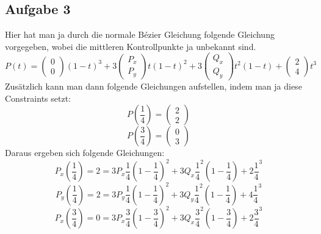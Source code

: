 \subsection{Aufgabe 3}
Hier hat man ja durch die normale Bézier Gleichung folgende Gleichung vorgegeben, wobei die mittleren Kontrollpunkte ja unbekannt sind.
\begin{displaymath}
P(t) =  \begin{pmatrix}0 \\ 0\end{pmatrix} (1-t)^3 + 3 \begin{pmatrix}P_x \\ P_y\end{pmatrix}t(1-t)^2+3 \begin{pmatrix}Q_x \\ Q_y\end{pmatrix}t^2(1-t)+ \begin{pmatrix}2 \\ 4\end{pmatrix}t^3
\end{displaymath}
Zusätzlich kann man dann folgende Gleichungen aufstellen, indem man ja diese Constraints setzt:
\begin{displaymath}
P\left(\frac{1}{4}\right) =  \begin{pmatrix}2 \\ 2\end{pmatrix}
\end{displaymath}
\begin{displaymath}
P\left(\frac{3}{4}\right) =  \begin{pmatrix}0 \\ 3\end{pmatrix}
\end{displaymath}
Daraus ergeben sich folgende Gleichungen:
\begin{displaymath}
P_x\left(\frac{1}{4}\right) = 2 = 3 P_x \frac{1}{4}\left(1-\frac{1}{4}\right)^2+3Q_x\frac{1}{4}^2\left(1-\frac{1}{4}\right)+2\frac{1}{4}^3
\end{displaymath}
\begin{displaymath}
P_y\left(\frac{1}{4}\right) = 2 = 3 P_y \frac{1}{4}\left(1-\frac{1}{4}\right)^2+3Q_y\frac{1}{4}^2\left(1-\frac{1}{4}\right)+4\frac{1}{4}^3
\end{displaymath}
\begin{displaymath}
P_x\left(\frac{3}{4}\right) = 0 = 3 P_x \frac{3}{4}\left(1-\frac{3}{4}\right)^2+3Q_x\frac{3}{4}^2\left(1-\frac{3}{4}\right)+2\frac{3}{4}^3
\end{displaymath}
